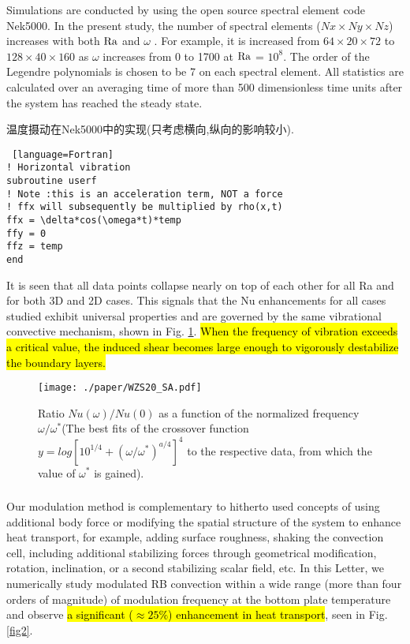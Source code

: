 \documentclass{hmj}
\newcommand\Ra{\mbox{\textrm{Ra}}} %
\begin{document}
Simulations are conducted by using the open source spectral element code Nek5000. In the present study, the number of spectral elements ($Nx \times Ny\times Nz$) increases with both $\Ra$ and $\omega$ . For example, it is increased from $64 \times 20\times 72$ to $128\times 40\times 160$ as {\color{red}$\omega$ increases from 0 to 1700} at $\Ra$ = $10^8$. The order of the Legendre polynomials is chosen to be 7 on each spectral element. All statistics are calculated over an averaging time of more than 500 dimensionless time units after the system has reached the steady state.

温度摄动在Nek5000中的实现(只考虑横向,纵向的影响较小).
\lstset{style=mystyle}
\begin{lstlisting} [language=Fortran]
! Horizontal vibration
subroutine userf
! Note :this is an acceleration term, NOT a force
! ffx will subsequently be multiplied by rho(x,t)
ffx = \delta*cos(\omega*t)*temp
ffy = 0
ffz = temp
end
\end{lstlisting}
 
 It is seen that all data points collapse nearly on top of each other for all Ra and for both 3D and 2D cases. This signals that the Nu enhancements for all cases studied exhibit universal properties and are governed by the same vibrational convective mechanism, shown in Fig. \ref{fig1}. \hl{When the frequency of vibration exceeds a critical value, the induced shear becomes large enough to vigorously destabilize the boundary layers. }

\begin{figure}
  \centering
  \centering
  \texttt{[image: ./paper/WZS20\_SA.pdf]}
  \renewcommand{\figurename}{Figure}
  \caption{Ratio $Nu(\omega)/Nu(0)$ as a function of the normalized frequency $\omega /\omega^*$(The best fits of the crossover function $y = log [10^{1/4} + (\omega/\omega^*)^{a/4}]^4$ to the respective data, from which the value of $\omega^*$ is gained).}
  \renewcommand{\figurename}{图}
\label{fig1}
\end{figure}
 
 \subsubsection{\cite{Yang2020}}
 Our modulation method is complementary to hitherto used concepts of using additional body force or modifying the spatial structure of the system to enhance heat transport, for example, adding surface roughness, shaking the convection cell, including additional stabilizing forces through geometrical modification, rotation, inclination, or a second stabilizing scalar field, etc.
 In this Letter, we numerically study modulated RB convection within a wide range (more than four orders of magnitude) of modulation frequency at the bottom plate temperature and observe \hl{a significant ($\approx 25\%$) enhancement in heat transport}, seen in Fig. \ref{fig2}.
 
\end{document}

